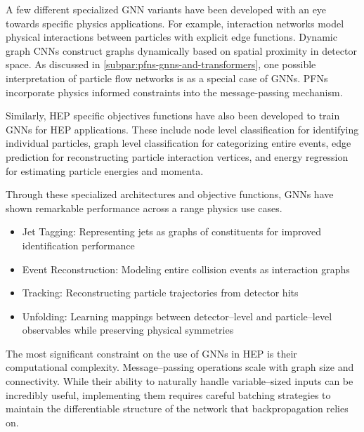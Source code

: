                 A few different specialized GNN variants have been developed with an eye towards specific physics applications.
                For example,
                interaction networks model physical interactions between particles with explicit edge functions.
                Dynamic graph CNNs construct graphs dynamically based on spatial proximity in detector space.
                As discussed in \cref{subpar:pfns-gnns-and-transformers}, one possible interpretation of particle flow networks is as a special case of GNNs.
                PFNs incorporate physics informed constraints into the message-passing mechanism.
                
                Similarly, HEP specific objectives functions have also been developed to train GNNs for HEP applications. 
                These include node level classification for identifying individual particles,
                graph level classification for categorizing entire events,
                edge prediction for reconstructing particle interaction vertices,
                and energy regression for estimating particle energies and momenta.
        
                Through these specialized architectures and objective functions, GNNs have shown remarkable performance across a range physics use cases.
                \begin{itemize}
                    \item Jet Tagging: Representing jets as graphs of constituents for improved identification performance
                    \item Event Reconstruction: Modeling entire collision events as interaction graphs
                    \item Tracking: Reconstructing particle trajectories from detector hits
                    \item Unfolding: Learning mappings between detector--level and particle--level observables while preserving physical symmetries
                \end{itemize}
                
                The most significant constraint on the use of GNNs in HEP is their computational complexity.
                Message--passing operations scale with graph size and connectivity.
                While their ability to naturally handle variable--sized inputs can be incredibly useful, implementing them requires careful batching strategies to maintain the differentiable structure of the network that backpropagation relies on.
    
